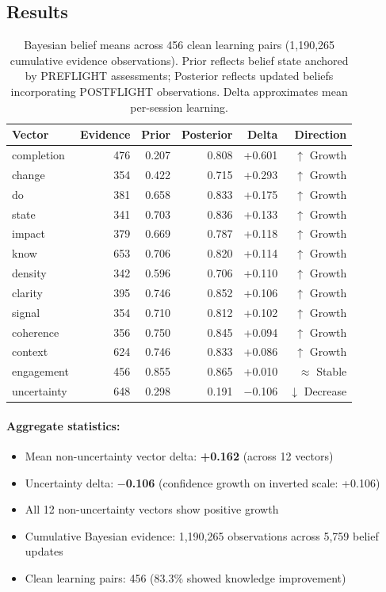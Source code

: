 \subsection{Results}

\begin{table}[h]
\centering
\begin{tabular}{lrrrrr}
\toprule
\textbf{Vector} & \textbf{Evidence} & \textbf{Prior} & \textbf{Posterior} & \textbf{Delta} & \textbf{Direction} \\
\midrule
completion & 476 & 0.207 & 0.808 & +0.601 & $\uparrow$ Growth \\
change & 354 & 0.422 & 0.715 & +0.293 & $\uparrow$ Growth \\
do & 381 & 0.658 & 0.833 & +0.175 & $\uparrow$ Growth \\
state & 341 & 0.703 & 0.836 & +0.133 & $\uparrow$ Growth \\
impact & 379 & 0.669 & 0.787 & +0.118 & $\uparrow$ Growth \\
know & 653 & 0.706 & 0.820 & +0.114 & $\uparrow$ Growth \\
density & 342 & 0.596 & 0.706 & +0.110 & $\uparrow$ Growth \\
clarity & 395 & 0.746 & 0.852 & +0.106 & $\uparrow$ Growth \\
signal & 354 & 0.710 & 0.812 & +0.102 & $\uparrow$ Growth \\
coherence & 356 & 0.750 & 0.845 & +0.094 & $\uparrow$ Growth \\
context & 624 & 0.746 & 0.833 & +0.086 & $\uparrow$ Growth \\
engagement & 456 & 0.855 & 0.865 & +0.010 & $\approx$ Stable \\
uncertainty & 648 & 0.298 & 0.191 & $-$0.106 & $\downarrow$ Decrease \\
\bottomrule
\end{tabular}
\caption{Bayesian belief means across 456 clean learning pairs (1,190,265 cumulative evidence observations). Prior reflects belief state anchored by PREFLIGHT assessments; Posterior reflects updated beliefs incorporating POSTFLIGHT observations. Delta approximates mean per-session learning.}
\label{tab:learning-analysis}
\end{table}

\paragraph{Aggregate statistics:}
\begin{itemize}
    \item Mean non-uncertainty vector delta: \textbf{+0.162} (across 12 vectors)
    \item Uncertainty delta: \textbf{$-$0.106} (confidence growth on inverted scale: +0.106)
    \item All 12 non-uncertainty vectors show positive growth
    \item Cumulative Bayesian evidence: 1,190,265 observations across 5,759 belief updates
    \item Clean learning pairs: 456 (83.3\% showed knowledge improvement)
\end{itemize}

